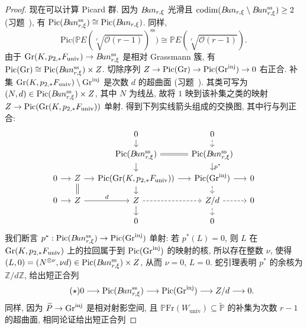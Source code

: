 \begin{proof}
现在可以计算 Picard 群. 因为 $B\!un_{r,\xi}$ 光滑且 $\operatorname{codim}(B\!un_{r,\xi}\setminus B\!un_{r,\xi}^{\mathrm{ss}})\geq2$ (习题~), 有 $\mathrm{Pic}(B\!un_{r,\xi}^{\mathrm{ss}})\cong\mathrm{Pic}(B\!un_{r,\xi})$. 同样,
\[
\mathrm{Pic}\big(\mathbb PE(\sqrt[r]{\mathcal O(r-1)})^{\mathrm{ss}}\big)\cong\mathbb PE(\sqrt[r]{\mathcal O(r-1)}).
\]
由于 $\operatorname{Gr}(K,p_{2,*}F_{\mathrm{univ}})\to B\!un_{r,\xi}^{\mathrm{ss}}$ 是相对 Grassmann 簇, 有 $\mathrm{Pic}(\operatorname{Gr})\cong\mathrm{Pic}(B\!un_{r,\xi}^{\mathrm{ss}})\times Z$. 切除序列 $Z\to\mathrm{Pic}(\operatorname{Gr})\to\mathrm{Pic}(\operatorname{Gr}^{\mathrm{inj}})\to0$ 右正合. 补集 $\operatorname{Gr}(K,p_{2,*}F_{\mathrm{univ}})\setminus\operatorname{Gr}^{\mathrm{inj}}$ 是次数 $d$ 的超曲面 (习题~). 其类可写为 $(N,d)\in\mathrm{Pic}(B\!un_{r,\xi}^{\mathrm{ss}})\times Z$, 其中 $N$ 为线丛, 故将 $1$ 映到该补集之类的映射 $Z\to\mathrm{Pic}(\operatorname{Gr}(K,p_{2,*}F_{\mathrm{univ}}))$ 单射. 得到下列实线箭头组成的交换图, 其中行与列正合:
\[
\begin{tikzcd}[ampersand replacement=\&,column sep=small,row sep=small]
\&\&0\arrow[d]\&0\arrow[d,dashed]\&\\
\&\&\mathrm{Pic}(\cBun_{r,\xi}^{\mathrm{ss}})\arrow[d]\arrow[r,equal]\&\mathrm{Pic}(\cBun_{r,\xi}^{\mathrm{ss}})\arrow[d,"p^*"]\&\\
0\arrow[r]\&\mathbb Z\arrow[r]\arrow[d,equal]\&\mathrm{Pic}(\Gr(K,p_{2,*}\mathcal F_{\mathrm{univ}}))\arrow[r]\arrow[d]\&\mathrm{Pic}(\Gr^{\mathrm{inj}})\arrow[r]\arrow[d,dashed]\&0\\
0\arrow[r]\&\mathbb Z\arrow[r,"d"]\&\mathbb Z\arrow[d]\arrow[r,dashed]\&\mathbb Z/d\arrow[d,dashed]\arrow[r,dashed]\&0\\
\&\&0\&0\&
\end{tikzcd}
\]
我们断言 $p^*:\mathrm{Pic}(B\!un_{r,\xi}^{\mathrm{ss}})\to\mathrm{Pic}(\operatorname{Gr}^{\mathrm{inj}})$ 单射: 若 $p^*(L)=0$, 则 $L$ 在 $\operatorname{Gr}(K,p_{2,*}F_{\mathrm{univ}})$ 上的拉回属于到 $\mathrm{Pic}(\operatorname{Gr}^{\mathrm{inj}})$ 的映射的核, 所以存在整数 $\nu$, 使得 $(L,0)=(N^{\otimes\nu},\nu d)\in\mathrm{Pic}(B\!un_{r,\xi}^{\mathrm{ss}})\times Z$, 从而 $\nu=0$, $L=0$. 蛇引理表明 $p^*$ 的余核为 $\mathbb Z/d\mathbb Z$, 给出短正合列
\begin{equation*}\tag{$\star$}\label{src:9.4-picard-star}
0\longrightarrow\mathrm{Pic}(B\!un_{r,\xi}^{\mathrm{ss}})\longrightarrow\mathrm{Pic}(\operatorname{Gr}^{\mathrm{inj}})\longrightarrow Z/d\longrightarrow0.
\end{equation*}
同样, 因为 $\widetilde{P}\to\operatorname{Gr}^{\mathrm{inj}}$ 是相对射影空间, 且 $\mathbb P\mathrm{Fr}(W_{\mathrm{univ}})\subseteq\widetilde{\mathbb P}$ 的补集为次数 $r-1$ 的超曲面, 相同论证给出短正合列

\end{proof}
